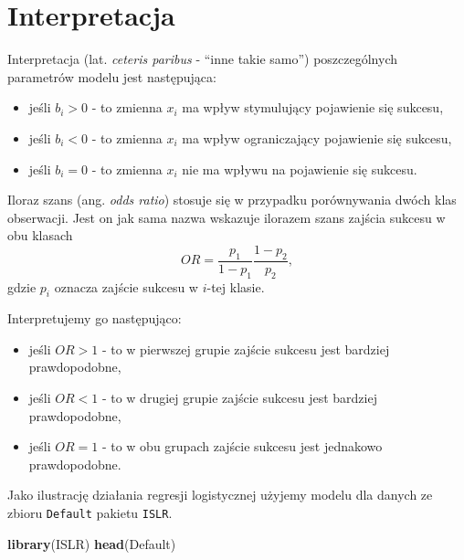 \documentclass[]{book}
\newenvironment{Shaded}{\begin{snugshade}}{\end{snugshade}}
\newcommand{\KeywordTok}[1]{\textcolor[rgb]{0.13,0.29,0.53}{\textbf{#1}}}
\newcommand{\NormalTok}[1]{#1}
\providecommand{\tightlist}{%
  \setlength{\itemsep}{0pt}\setlength{\parskip}{0pt}}
\theoremstyle{plain}
\theoremstyle{definition}
\theoremstyle{definition}
\theoremstyle{definition}
\theoremstyle{definition}
\theoremstyle{remark}
\let\BeginKnitrBlock\begin \let\EndKnitrBlock\end
\begin{document}
\hypertarget{interpretacja}{%
\section{Interpretacja}\label{interpretacja}}

Interpretacja (lat. \emph{ceteris paribus} - ``inne takie samo'') poszczególnych parametrów modelu jest następująca:

\begin{itemize}
\tightlist
\item
  jeśli \(b_i>0\) - to zmienna \(x_i\) ma wpływ stymulujący pojawienie się sukcesu,
\item
  jeśli \(b_i<0\) - to zmienna \(x_i\) ma wpływ ograniczający pojawienie się sukcesu,
\item
  jeśli \(b_i=0\) - to zmienna \(x_i\) nie ma wpływu na pojawienie się sukcesu.
\end{itemize}

Iloraz szans (ang. \emph{odds ratio}) stosuje się w przypadku porównywania dwóch klas obserwacji. Jest on jak sama nazwa wskazuje ilorazem szans zajścia sukcesu w obu klasach
\begin{equation}
    OR = \frac{p_1}{1-p_1}\frac{1-p_2}{p_2},
\end{equation}
gdzie \(p_i\) oznacza zajście sukcesu w \(i\)-tej klasie.

Interpretujemy go następująco:

\begin{itemize}
\tightlist
\item
  jeśli \(OR>1\) - to w pierwszej grupie zajście sukcesu jest bardziej prawdopodobne,
\item
  jeśli \(OR<1\) - to w drugiej grupie zajście sukcesu jest bardziej prawdopodobne,
\item
  jeśli \(OR=1\) - to w obu grupach zajście sukcesu jest jednakowo prawdopodobne.
\end{itemize}

\BeginKnitrBlock{example}
\protect\hypertarget{exm:logit}{}{\label{exm:logit} }Jako ilustrację działania regresji logistycznej użyjemy modelu dla danych ze zbioru \texttt{Default} pakietu \texttt{ISLR}.
\EndKnitrBlock{example}

\begin{Shaded}
\begin{Highlighting}[]
\KeywordTok{library}\NormalTok{(ISLR)}
\KeywordTok{head}\NormalTok{(Default)}
\end{Highlighting}
\end{Shaded}
\end{document}
